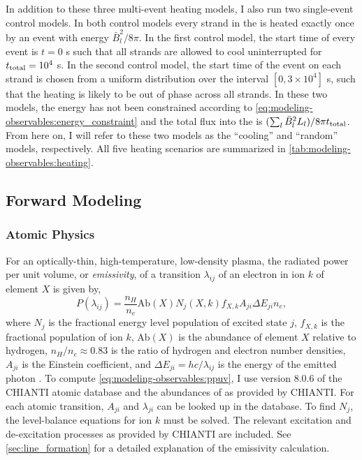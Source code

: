 In addition to these three multi-event heating models, I also run two single-event control models. In both control models every strand in the \AR{} is heated exactly once by an event with energy $\bar{B}_l^2/8\pi$. In the first control model, the start time of every event is $t=0$ s such that all strands are allowed to cool uninterrupted for $t_\textup{total}=10^4$ s. In the second control model, the start time of the event on each strand is chosen from a uniform distribution over the interval $[0, 3\times10^4]$ s, such that the heating is likely to be out of phase across all strands. In these two models, the energy has not been constrained according to \autoref{eq:modeling-observables:energy_constraint} and the total flux into the \AR{} is $(\sum_{l}\bar{B}_l^2L_l)/8\pi t_\textup{total}$. From here on, I will refer to these two models as the ``cooling'' and ``random'' models, respectively. All five heating scenarios are summarized in \autoref{tab:modeling-observables:heating}.

\subsection{Forward Modeling}\label{sec:modeling-observables:forward}

\subsubsection{Atomic Physics}\label{sec:modeling-observables:atomic}

For an optically-thin, high-temperature, low-density plasma, the radiated power per unit volume, or \textit{emissivity}, of a transition $\lambda_{ij}$ of an electron in ion $k$ of element $X$ is given by,
\begin{equation}\label{eq:modeling-observables:ppuv}
    P(\lambda_{ij}) = \frac{n_H}{n_e}\mathrm{Ab}(X)N_j(X,k)f_{X,k}A_{ji}\Delta E_{ji}n_e,
\end{equation}
where $N_j$ is the fractional energy level population of excited state $j$, $f_{X,k}$ is the fractional population of ion $k$, $\mathrm{Ab}(X)$ is the abundance of element $X$ relative to hydrogen, $n_H/n_e\approx0.83$ is the ratio of hydrogen and electron number densities, $A_{ji}$ is the Einstein coefficient, and $\Delta E_{ji}=hc/\lambda_{ij}$ is the energy of the emitted photon \citep[see][]{mason_spectroscopic_1994,del_zanna_solar_2018}. To compute \autoref{eq:modeling-observables:ppuv}, I use version 8.0.6 of the CHIANTI atomic database \citep{dere_chianti_1997,young_chianti_2016} and the abundances of \citet{feldman_potential_1992} as provided by CHIANTI. For each atomic transition, $A_{ji}$ and $\lambda_{ji}$ can be looked up in the database. To find $N_j$, the level-balance equations for ion $k$ must be solved. The relevant excitation and de-excitation processes as provided by CHIANTI \citep[see section 3.3 of][]{del_zanna_solar_2018} are included. See \autoref{sec:line_formation} for a detailed explanation of the emissivity calculation.

